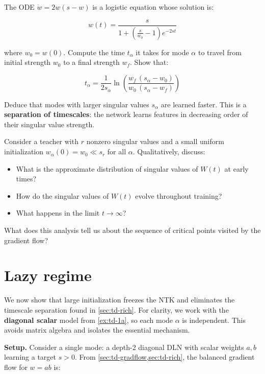 \documentclass[11pt]{article}
\providecommand{\tightlist}{%
  \setlength{\itemsep}{0pt}\setlength{\parskip}{0pt}}
\begin{document}
\begin{exercise}
\label{ex:td-3b}
The ODE
\(\dot{w} = 2w(s - w)\) is a logistic equation whose solution is:

\[w(t) = \frac{s}{1 + \left(\frac{s}{w_0} - 1\right)e^{-2st}}\]

where \(w_0 = w(0)\). Compute the time \(t_\alpha\) it takes for mode
\(\alpha\) to travel from initial strength \(w_0\) to a final strength
\(w_f\). Show that:

\[t_\alpha = \frac{1}{2 s_\alpha} \ln\left(\frac{w_f\,(s_\alpha - w_0)}{w_0\,(s_\alpha - w_f)}\right)\]

Deduce that modes with larger singular values \(s_\alpha\) are learned
faster. This is a \textbf{separation of timescales}: the network learns
features in decreasing order of their singular value strength.
\end{exercise}


\begin{exercise}
\label{ex:td-3c}
Consider a teacher with
\(r\) nonzero singular values and a small uniform initialization
\(w_\alpha(0) = w_0 \ll s_r\) for all \(\alpha\). Qualitatively, discuss:

\begin{itemize}
\tightlist
\item
  What is the approximate distribution of singular values of \(W(t)\) at early times?
\item
  How do the singular values of $W(t)$ evolve throughout training?
\item
  What happens in the limit \(t \to \infty\)?
\end{itemize}

What does this analysis tell us about the sequence of critical points visited by
the gradient flow?
\end{exercise}


\section{Lazy regime}
\label{sec:td-lazy}

We now show that large initialization freezes the NTK and eliminates the
timescale separation found in \cref{sec:td-rich}. For clarity, we work with the
\textbf{diagonal scalar} model from \cref{ex:td-1a}, so each mode
\(\alpha\) is independent. This avoids matrix algebra and isolates the
essential mechanism.

\textbf{Setup.} Consider a single mode: a depth-2 diagonal
DLN with scalar weights \(a, b\) learning a target \(s > 0\). From
\cref{sec:td-gradflow,sec:td-rich}, the balanced gradient flow for \(w = ab\) is:
\end{document}
